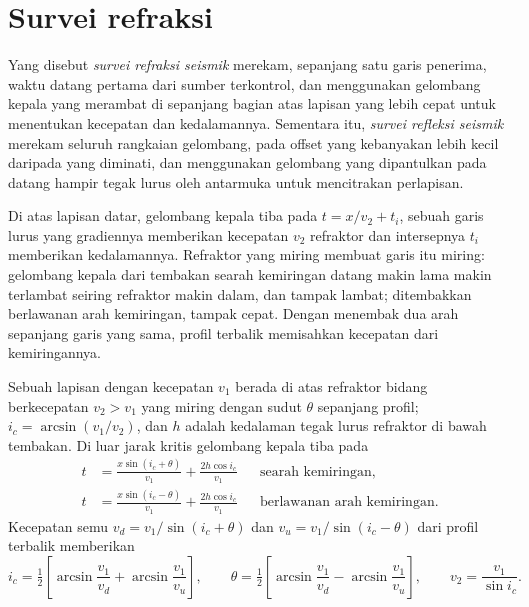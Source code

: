 \section{Survei refraksi}

\begin{definition}\label{def:b3:exploration-seismology:surveys}
Yang disebut \emph{survei refraksi seismik} merekam, sepanjang
satu garis penerima, waktu datang pertama dari sumber terkontrol, dan menggunakan
gelombang kepala yang merambat di sepanjang bagian atas lapisan yang lebih cepat untuk menentukan kecepatan dan
kedalamannya. Sementara itu, \emph{survei refleksi seismik}
merekam seluruh rangkaian gelombang, pada offset yang kebanyakan lebih kecil daripada
yang diminati, dan menggunakan gelombang yang dipantulkan pada datang hampir tegak lurus oleh
antarmuka untuk mencitrakan perlapisan.
\end{definition}

Di atas lapisan datar, gelombang kepala tiba pada $t = x/v_2 + t_i$, sebuah garis lurus
yang gradiennya memberikan kecepatan $v_2$ refraktor dan intersepnya $t_i$
memberikan kedalamannya. Refraktor yang miring membuat garis itu miring: gelombang kepala dari tembakan
searah kemiringan datang makin lama makin terlambat seiring refraktor makin dalam, dan tampak lambat;
ditembakkan berlawanan arah kemiringan, tampak cepat. Dengan menembak dua arah sepanjang garis yang sama, profil terbalik
memisahkan kecepatan dari kemiringannya.

\begin{theorem}\label{thm:b3:exploration-seismology:dipping}
Sebuah lapisan dengan kecepatan $v_1$ berada di atas refraktor bidang berkecepatan $v_2 > v_1$ yang miring
dengan sudut $\theta$ sepanjang profil; $i_c = \arcsin(v_1/v_2)$, dan $h$ adalah
kedalaman tegak lurus refraktor di bawah tembakan. Di luar jarak kritis
gelombang kepala tiba pada
\begin{align*}
  t &= \frac{x\sin(i_c + \theta)}{v_1} + \frac{2h\cos i_c}{v_1}
  &&\text{searah kemiringan},\\
  t &= \frac{x\sin(i_c - \theta)}{v_1} + \frac{2h\cos i_c}{v_1}
  &&\text{berlawanan arah kemiringan}.
\end{align*}
Kecepatan semu $v_d = v_1/\sin(i_c + \theta)$ dan
$v_u = v_1/\sin(i_c - \theta)$ dari profil terbalik memberikan
\[
  i_c = \tfrac12\left[\arcsin\frac{v_1}{v_d} + \arcsin\frac{v_1}{v_u}\right],\qquad
  \theta = \tfrac12\left[\arcsin\frac{v_1}{v_d} - \arcsin\frac{v_1}{v_u}\right],
  \qquad v_2 = \frac{v_1}{\sin i_c} .
\]
\end{theorem}

